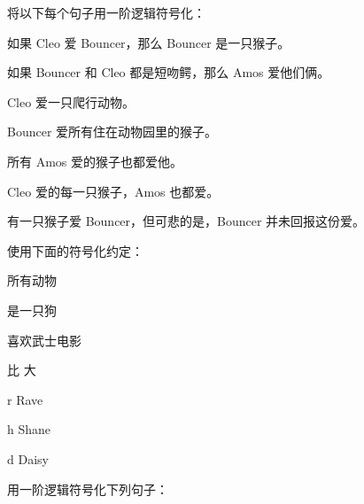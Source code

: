 将以下每个句子用一阶逻辑符号化：


\begin{compactlist}
\item 如果 Cleo 爱 Bouncer，那么 Bouncer 是一只猴子。
\item 如果 Bouncer 和 Cleo 都是短吻鳄，那么 Amos 爱他们俩。
\item Cleo 爱一只爬行动物。
\item Bouncer 爱所有住在动物园里的猴子。
\item 所有 Amos 爱的猴子也都爱他。
\item Cleo 爱的每一只猴子，Amos 也都爱。
\item 有一只猴子爱 Bouncer，但可悲的是，Bouncer 并未回报这份爱。
\end{compactlist}

\problempart
使用下面的符号化约定：


\begin{ekey}
\item[\text{论域}] 所有动物
\item[\atom{D}{x}]  是一只狗
\item[\atom{S}{x}]  喜欢武士电影
\item[\atom{L}{x,y}]  比  大
\item[r] Rave
\item[h] Shane
\item[d] Daisy
\end{ekey}


用一阶逻辑符号化下列句子：


